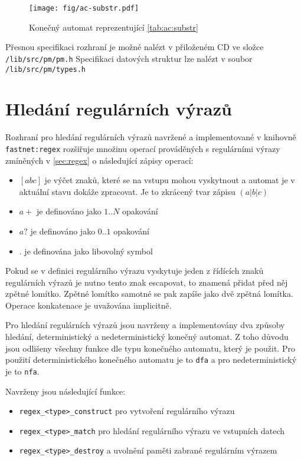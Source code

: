 \begin{figure}[!htbp]
    \centering
    \texttt{[image: fig/ac-substr.pdf]}
    \caption{Konečný automat reprezentující \ref{tab:ac:substr}}
    \label{fig:ac:substr}
\end{figure}


Přesnou specifikaci rozhraní je možné nalézt v přiloženém CD ve složce \texttt{/lib/src/pm/pm.h}
Specifikaci datových struktur lze nalézt v soubor \texttt{/lib/src/pm/types.h}

\section{Hledání regulárních výrazů}\label{api:regex}  %

Rozhraní pro hledání regulárních výrazů navržené a implementované v knihovně \texttt{fastnet:regex}
rozšiřuje množinu operací prováděných s regulárními výrazy zmíněných v \ref{sec:regex} o následující zápisy operací:

\begin{itemize}
    \item{$[abc]$ je výčet znaků, které se na vstupu mohou vyskytnout a automat je v aktuální stavu dokáže zpracovat. Je to zkrácený tvar zápisu $(a|b|c)$}
    \item{$a+$ je definováno jako $1..N$ opakování}
    \item{$a?$ je definováno jako $0..1$ opakování}
    \item{$.$ je definována jako libovolný symbol}
\end{itemize}

Pokud se v definici regulárního výrazu vyskytuje jeden z řídících znaků regulárních výrazů
je nutno tento znak escapovat, to znamená přidat před něj zpětné lomítko.
Zpětné lomítko samotné se pak zapíše jako dvě zpětná lomítka. Operace konkatenace je uvažována implicitně.

Pro hledání regulárních výrazů jsou navrženy a implementovány dva způsoby hledání,
deterministický a nedeterministický konečný automat.
Z toho důvodu jsou odlišeny všechny funkce dle typu konečného automatu, který je použit.
Pro použití deterministického konečného automatu je to \texttt{dfa} a pro nedeterministický
je to \texttt{nfa}.

Navrženy jsou následující funkce:

\begin{itemize}
    \item{\texttt{regex\_<type>\_construct} pro vytvoření regulárního výrazu}
    \item{\texttt{regex\_<type>\_match} pro hledání regulárního výrazu ve vstupních datech}
    \item{\texttt{regex\_<type>\_destroy} a uvolnění paměti zabrané regulárním výrazem}
\end{itemize}

